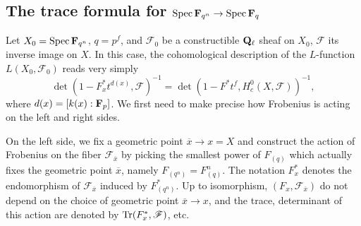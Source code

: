 \documentclass[deligne.tex]{subfiles}
\begin{document}
\setcounter{section}{2}\setcounter{subsection}{0}
\subsection{The trace formula for $\operatorname{Spec}{\mathbf{F}_{q^n}}\rightarrow\operatorname{Spec}{\mathbf{F}_q}$}
Let $X_0=\operatorname{Spec}{\mathbf{F}_{q^n}}$, $q=p^f$,
and $\mathscr F_0$ be a constructible $\mathbf{Q}_\ell$
sheaf on $X_0$, $\mathscr F$ its inverse image on $X$.
In this case, the cohomological description of the
$L$-function $L(X_0,\mathscr F_0)$ reads very simply
\begin{equation*}
    \tag{$\ast$}\det(1-F^\ast_x t^{d(x)},\mathscr F)^{-1}
    =\det(1-F^\ast t^f,H^0_c(X,\mathscr F))^{-1},
\end{equation*}
where $d(x)=[k(x):\mathbf{F}_p]$. We first need to make precise how Frobenius
is acting on the left and right sides.

On the left side, we fix a geometric point $\overline x\rightarrow x=X$ and
construct the action of Frobenius on the fiber $\mathscr F_{\overline x}$
by picking the smallest power of $F_{(q)}$ which actually fixes the
geometric point $\overline x$, namely $F_{(q^n)}=F_{(q)}^n$.
The notation $F^\ast_x$ denotes the endomorphism of
$\mathscr F_{\overline x}$ induced by $F^\ast_{(q^n)}$.
Up to isomorphism, $(F_x,\mathscr F_{\overline x})$ do not depend on the
choice of geometric point $\overline x\rightarrow x$, and the trace,
determinant of this action are denoted by $\operatorname{Tr}(F_x^\ast,\mathscr F)$, etc.
\end{document}
